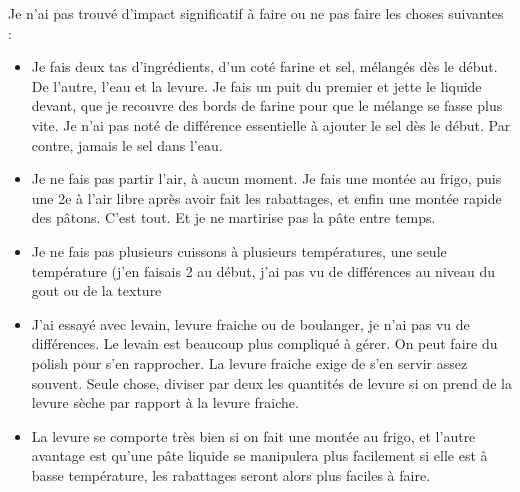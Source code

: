 \documentclass[a4paper,twoside,openright]{report}
\begin{document}
Je n'ai pas trouvé d'impact significatif à faire ou ne pas faire les choses suivantes : 
\begin{itemize}
\item Je fais deux tas d'ingrédients, d'un coté farine et sel, mélangés dès le début. De l'autre, l'eau et la levure. Je fais 
un puit du premier et jette le liquide devant, que je recouvre des bords de farine pour que le mélange se fasse plus vite. Je 
n'ai pas noté de différence essentielle à ajouter le sel dès le début. Par contre, jamais le sel dans l'eau. 
\item Je ne fais pas partir l'air, à aucun moment. Je fais une montée au frigo, puis une 2e à l'air libre après avoir fait les 
rabattages, et enfin une montée rapide des pâtons. C'est tout. Et je ne martirise pas la pâte entre temps. 
\item Je ne fais pas plusieurs cuissons à plusieurs températures, une seule température (j'en faisais 2 au début, j'ai pas vu 
de différences au niveau du gout ou de la texture
\item J'ai essayé avec levain, levure fraiche ou de boulanger, je n'ai pas vu de différences. Le levain est beaucoup plus 
compliqué à gérer. On peut faire du polish pour s'en rapprocher. La levure fraiche exige de s'en servir assez souvent. Seule 
chose, diviser par deux les quantités de levure si on prend de la levure sèche par rapport à la levure fraiche. 
\item La levure se comporte très bien si on fait une montée au frigo, et l'autre avantage est qu'une pâte liquide se manipulera 
plus facilement si elle est à basse température, les rabattages seront alors plus faciles à faire.
\end{itemize}
\end{document}
